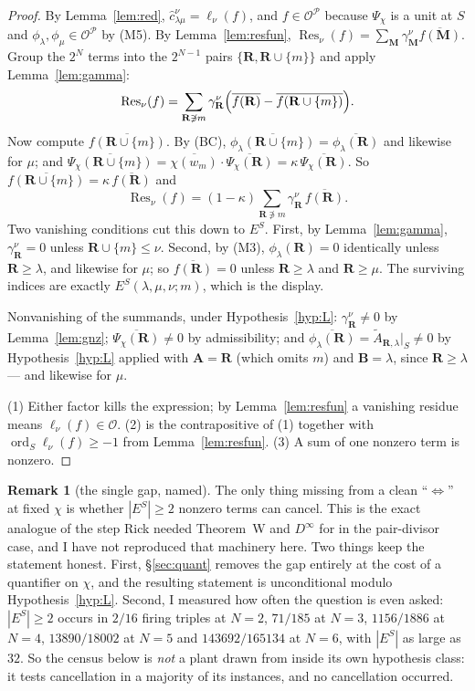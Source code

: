 \documentclass[11pt]{article}
\theoremstyle{definition}
\newtheorem{rem}[thm]{Remark}
\newcommand{\At}{\widetilde{A}}
\newcommand{\bM}{\mathbf{M}}
\newcommand{\bA}{\mathbf{A}}
\newcommand{\bB}{\mathbf{B}}
\newcommand{\bR}{\mathbf{R}}
\newcommand{\ord}{\operatorname{ord}}
\newcommand{\ES}{E^{S}}
\begin{document}
\begin{proof}
By Lemma~\ref{lem:red}, $\hat c^{\nu}_{\lambda\mu}=\ell_\nu(f)$, and
$f\in\mathcal{O}^{\mathcal{P}}$ because $\Psi_\chi$ is a unit at $S$ and
$\phi_\lambda,\phi_\mu\in\mathcal{O}^{\mathcal{P}}$ by (M5).  By
Lemma~\ref{lem:resfun},
$\operatorname{Res}_\nu(f)=\sum_{\bM}\gamma^{\nu}_{\bM}\overline{f(\bM)}$.  Group
the $2^{N}$ terms into the $2^{N-1}$ pairs $\{\bR,\bR\cup\{m\}\}$ and apply
Lemma~\ref{lem:gamma}:
\[
  \operatorname{Res}_\nu(f)
  =\sum_{\bR\not\ni m}\gamma^{\nu}_{\bR}
     \Bigl(\overline{f(\bR)}-\overline{f(\bR\cup\{m\})}\Bigr).
\]
Now compute $\overline{f(\bR\cup\{m\})}$.  By (BC),
$\overline{\phi_\lambda(\bR\cup\{m\})}=\overline{\phi_\lambda(\bR)}$ and likewise
for $\mu$; and
$\overline{\Psi_\chi(\bR\cup\{m\})}
=\overline{\chi(w_m)}\cdot\overline{\Psi_\chi(\bR)}=\kappa\,\overline{\Psi_\chi(\bR)}$.
So $\overline{f(\bR\cup\{m\})}=\kappa\,\overline{f(\bR)}$ and
\[
  \operatorname{Res}_\nu(f)
  =(1-\kappa)\sum_{\bR\not\ni m}\gamma^{\nu}_{\bR}\,\overline{f(\bR)} .
\]
Two vanishing conditions cut this down to $\ES$.  First, by
Lemma~\ref{lem:gamma}, $\gamma^{\nu}_{\bR}=0$ unless $\bR\cup\{m\}\le\nu$.
Second, by (M3), $\phi_\lambda(\bR)=0$ identically unless $\bR\ge\lambda$, and
likewise for $\mu$; so $\overline{f(\bR)}=0$ unless $\bR\ge\lambda$ and
$\bR\ge\mu$.  The surviving indices are exactly $\ES(\lambda,\mu,\nu;m)$, which
is the display.

Nonvanishing of the summands, under Hypothesis~\ref{hyp:L}: $\gamma^{\nu}_{\bR}\ne0$
by Lemma~\ref{lem:gnz}; $\overline{\Psi_\chi(\bR)}\ne0$ by admissibility; and
$\overline{\phi_\lambda(\bR)}=\At_{\bR,\lambda}|_{S}\ne0$ by
Hypothesis~\ref{hyp:L} applied with $\bA=\bR$ (which omits $m$) and
$\bB=\lambda$, since $\bR\ge\lambda$ --- and likewise for $\mu$.

(1) Either factor kills the expression; by Lemma~\ref{lem:resfun} a vanishing
residue means $\ell_\nu(f)\in\mathcal{O}$.  (2) is the contrapositive of (1)
together with $\ord_S\ell_\nu(f)\ge-1$ from Lemma~\ref{lem:resfun}.  (3) A sum of
one nonzero term is nonzero.
\end{proof}

\begin{rem}[the single gap, named]\label{rem:gap}
The only thing missing from a clean ``$\iff$'' at fixed $\chi$ is whether
$|\ES|\ge2$ nonzero terms can cancel.  This is the exact analogue of the step
Rick needed Theorem~W and $D^\infty$ for in the pair-divisor case, and I have not
reproduced that machinery here.  Two things keep the statement honest.  First,
\S\ref{sec:quant} removes the gap entirely at the cost of a quantifier on $\chi$,
and the resulting statement is unconditional modulo Hypothesis~\ref{hyp:L}.
Second, I measured how often the question is even asked: $|\ES|\ge2$ occurs in
$2/16$ firing triples at $N=2$, $71/185$ at $N=3$, $1156/1886$ at $N=4$,
$13890/18002$ at $N=5$ and $143692/165134$ at $N=6$, with $|\ES|$ as large as
$32$.  So the census below is \emph{not} a plant drawn from inside its own
hypothesis class: it tests cancellation in a majority of its instances, and no
cancellation occurred.
\end{rem}
\end{document}
